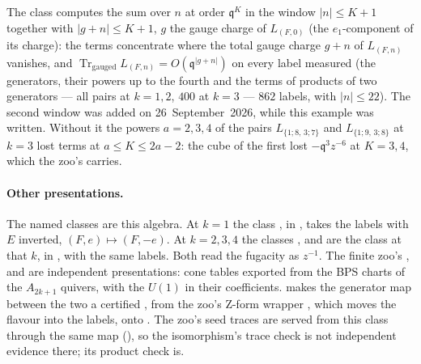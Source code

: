 \documentclass[11pt]{amsart}
\DeclareMathOperator{\Tr}{Tr}
\newcommand\fq{\mathfrak{q}}
\theoremstyle{remark}
\begin{document}
The class computes the sum over $n$ at order $\fq^K$ in the window
$|n|\le K+1$ together with $|g+n|\le K+1$, $g$ the gauge charge of
$L_{(F,0)}$ (the $e_1$-component of its charge): the terms concentrate where
the total gauge charge $g+n$ of $L_{(F,n)}$ vanishes, and
$\Tr_{\mathrm{gauged}}L_{(F,n)}=O(\fq^{|g+n|})$ on every label measured (the
generators, their powers up to the fourth and the terms of products of two
generators --- all pairs at $k=1,2$, $400$ at $k=3$ --- $862$ labels, with
$|n|\le22$).  The second window was added on
26~September~2026, while this example was written.  Without it the powers
$a=2,3,4$ of the pairs $L_{\{1;8,\,3;7\}}$ and $L_{\{1;9,\,3;8\}}$ at $k=3$
lost terms at $a\le K\le 2a-2$: the cube of the first lost $-\fq^3z^{-6}$ at
$K=3,4$, which the zoo's  carries.

\paragraph{Other presentations.}  The named classes are this algebra.  At
$k=1$ the class , in ,
takes the labels with $E$ inverted, $(F,e)\mapsto(F,-e)$.  At $k=2,3,4$ the
classes ,  and  are the
class  at that $k$, in
, with the same labels.  Both
read the fugacity as $z^{-1}$.  The finite zoo's ,
 and  are independent presentations: cone tables exported
from the BPS charts of the $A_{2k+1}$ quivers, with the $U(1)$ in
their coefficients.   makes the
generator map between the two a certified , from the zoo's
Z-form wrapper , which moves the flavour into the
labels, onto .  The
zoo's seed traces are served from this class through the same map
(), so the isomorphism's trace check is
not independent evidence there; its product check is.
\end{document}
